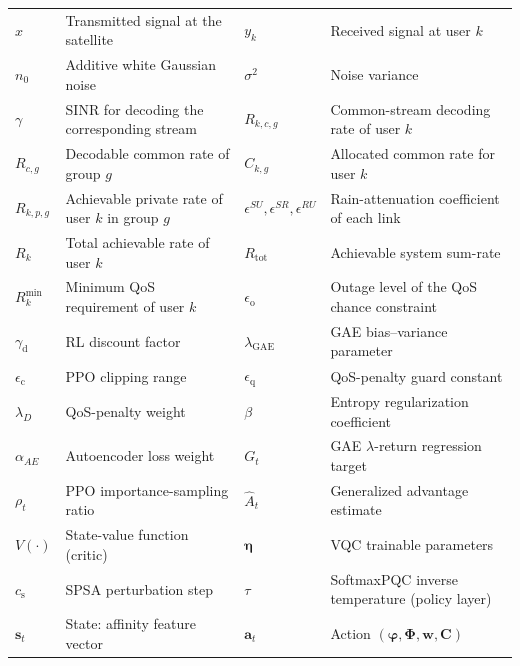 \documentclass[12pt,onecolumn]{IEEEtran}
\begin{document}
\begin{table}[t]
\begin{tabularx}{\textwidth}{
>{\centering\arraybackslash}p{1.6cm}
>{\raggedright\arraybackslash}X
>{\centering\arraybackslash}p{1.6cm}
>{\raggedright\arraybackslash}X
}
$x$ 
& Transmitted signal at the satellite
& $y_k$ 
& Received signal at user $k$ \\

$n_0$ 
& Additive white Gaussian noise
& $\sigma^2$ 
& Noise variance \\

$\gamma$ 
& SINR for decoding the corresponding stream
& $R_{k,c,g}$ 
& Common-stream decoding rate of user $k$ \\

$R_{c,g}$ 
& Decodable common rate of group $g$
& $C_{k,g}$ 
& Allocated common rate for user $k$ \\

$R_{k,p,g}$
& Achievable private rate of user $k$ in group $g$
& $\epsilon^{SU}\!,\epsilon^{SR}\!,\epsilon^{RU}$
& Rain-attenuation coefficient of each link \\

$R_k$ 
& Total achievable rate of user $k$
& $R_{\mathrm{tot}}$ 
& Achievable system sum-rate \\

$R_k^{\min}$ 
& Minimum QoS requirement of user $k$
& $\epsilon_{\mathrm{o}}$
& Outage level of the QoS chance constraint \\

$\gamma_{\mathrm d}$
& RL discount factor
& $\lambda_{\mathrm{GAE}}$
& GAE bias--variance parameter \\

$\epsilon_{\mathrm c}$
& PPO clipping range
& $\epsilon_{\mathrm q}$
& QoS-penalty guard constant \\

$\lambda_{D}$
& QoS-penalty weight
& $\beta$
& Entropy regularization coefficient \\

$\alpha_{AE}$
& Autoencoder loss weight
& $G_t$
& GAE $\lambda$-return regression target \\

$\rho_t$
& PPO importance-sampling ratio
& $\hat{A}_t$
& Generalized advantage estimate \\

$V(\cdot)$
& State-value function (critic)
& $\boldsymbol{\eta}$
& VQC trainable parameters \\

$c_{\mathrm s}$
& SPSA perturbation step
& $\tau$
& SoftmaxPQC inverse temperature (policy layer) \\

$\mathbf{s}_t$
& State: affinity feature vector
& $\mathbf{a}_t$
& Action $(\boldsymbol{\varphi},\boldsymbol{\Phi},\mathbf{w},\mathbf{C})$ \\


\end{tabularx}
\end{table}
\end{document}
